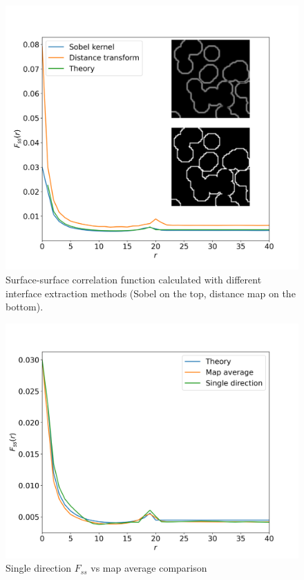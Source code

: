 \documentclass[reprint,amsmath,amssymb,aps,pre,showkeys,showpacs]{revtex4-1}
\begin{document}
\begin{figure}[ht]
  \centering
  \includegraphics[width=0.99\linewidth]{images/dm_sobel.png}
  \caption{Surface-surface correlation function calculated with different
    interface extraction methods (Sobel on the top, distance map on the
    bottom).}
  \label{fig:interface-extraction}
\end{figure}


\begin{figure}[ht]
  \centering
  \includegraphics[width=0.99\linewidth]{images/direction_and_map.png}
  \caption{Single direction $F_{ss}$ vs map average comparison}
  \label{fig:direction-vs-map}
\end{figure}
\end{document}
